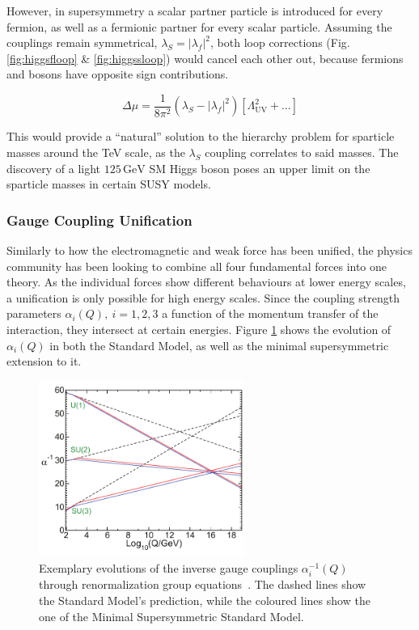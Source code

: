 However, in supersymmetry a scalar partner particle is introduced for every fermion, as well as a fermionic partner for every scalar particle. Assuming the couplings remain symmetrical, $\lambda_S = |\lambda_f|^2$, both loop corrections (Fig. \ref{fig:higgsfloop} \& \ref{fig:higgssloop}) would cancel each other out, because fermions and bosons have opposite sign contributions.

\begin{equation}
  \label{eq:higgscancelcorr}
  \Delta \mu = \frac{1}{8 \pi^2} (\lambda_S - |\lambda_f|^2) \left[ \Lambda^2_{\text{UV}} + ... \right]
\end{equation}

\noindent This would provide a ``natural'' solution to the hierarchy problem for sparticle masses around the TeV scale, as the $\lambda_S$ coupling correlates to said masses. The discovery of a light $125\,\text{GeV}$ SM Higgs boson poses an upper limit on the sparticle masses in certain SUSY models. 


\subsubsection{Gauge Coupling Unification}

Similarly to how the electromagnetic and weak force has been unified, the physics community has been looking to combine all four fundamental forces into one theory. As the individual forces show different behaviours at lower energy scales, a unification is only possible for high energy scales. Since the coupling strength parameters $\alpha_i(Q),\ i = 1, 2, 3$ a function of the momentum transfer of the interaction, they intersect at certain energies. Figure \ref{fig:coupq} shows the evolution of $\alpha_i(Q)$ in both the Standard Model, as well as the minimal supersymmetric extension to it. 

\begin{figure}[ht!]
  \centering
  \includegraphics[width=0.6\textwidth]{plots/coupq.pdf}
  \caption{Exemplary evolutions of the inverse gauge couplings $\alpha^{-1}_i(Q)$ through renormalization group equations~\cite{susyprimer}. The dashed lines show the Standard Model's prediction, while the coloured lines show the one of the Minimal Supersymmetric Standard Model.}
  \label{fig:coupq}
\end{figure}

